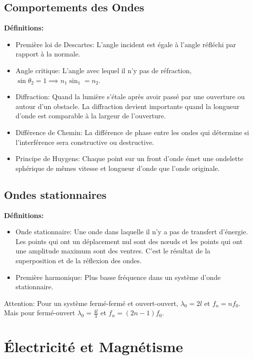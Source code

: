 \documentclass[french, a4paper, 12pt]{article}
\begin{document}
\subsection{Comportements des Ondes}
\textbf{Définitions:}
\begin{itemize}
\item Première loi de Descartes: L'angle incident est égale à l'angle réfléchi par rapport à la normale.
\item Angle critique: L'angle avec lequel il n'y pas de réfraction, $\sin \theta _2=1 \implies n_1 \sin _1=n_2$.
\item Diffraction: Quand la lumière s'étale après avoir passé par une ouverture ou autour d'un obstacle. La diffraction devient importante quand la longueur d'onde est comparable à la largeur de l'ouverture.
\item Différence de Chemin: La différence de phase entre les ondes qui détermine si l'interférence sera constructive ou destructive.
\item Principe de Huygens: Chaque point sur un front d'onde émet une ondelette sphérique de mêmes vitesse et longueur d'onde que l'onde originale.
\end{itemize}

\subsection{Ondes stationnaires}
\textbf{Définitions:}
\begin{itemize}
\item Onde stationnaire: Une onde dans laquelle il n'y a pas de transfert d'énergie. Les points qui ont un déplacement nul sont des nœuds et les points qui ont une amplitude maximum sont des ventres. C'est le résultat de la superposition et de la réflexion des ondes.
\item Première harmonique: Plus basse fréquence dans un système d'onde stationnaire.
\end{itemize}
Attention: Pour un système fermé-fermé et ouvert-ouvert, $\lambda _0= 2l$ et $f_n=nf_0$. Mais pour fermé-ouvert $\lambda _0= \frac{4l}{3}$ et $f_n=(2n-1)f_0$.
\pagebreak

\section{Électricité et Magnétisme}
\end{document}
